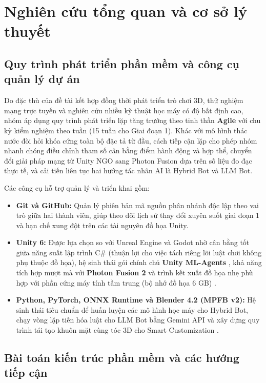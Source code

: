 \section{Nghiên cứu tổng quan và cơ sở lý thuyết}

\subsection{Quy trình phát triển phần mềm và công cụ quản lý dự án}
Do đặc thù của đề tài kết hợp đồng thời phát triển trò chơi 3D, thử nghiệm mạng trực tuyến và nghiên cứu nhiều kỹ thuật học máy có độ bất định cao, nhóm áp dụng quy trình phát triển lặp tăng trưởng theo tinh thần \textbf{Agile} với chu kỳ kiểm nghiệm theo tuần (15 tuần cho Giai đoạn 1). Khác với mô hình thác nước đòi hỏi khóa cứng toàn bộ đặc tả từ đầu, cách tiếp cận lặp cho phép nhóm nhanh chóng điều chỉnh tham số cân bằng điểm hành động và hợp thể, chuyển đổi giải pháp mạng từ Unity NGO sang Photon Fusion dựa trên số liệu đo đạc thực tế, và cải tiến liên tục hai hướng tác nhân AI là Hybrid Bot và LLM Bot.

Các công cụ hỗ trợ quản lý và triển khai gồm:
\begin{itemize}
    \item \textbf{Git và GitHub:} Quản lý phiên bản mã nguồn phân nhánh độc lập theo vai trò giữa hai thành viên, giúp theo dõi lịch sử thay đổi xuyên suốt giai đoạn 1 và hạn chế xung đột trên các tài nguyên đồ họa Unity.
    \item \textbf{Unity 6:} Được lựa chọn so với Unreal Engine và Godot nhờ cân bằng tốt giữa năng suất lập trình C\# (thuận lợi cho việc tách riêng lõi luật chơi không phụ thuộc đồ họa), hệ sinh thái gói chính chủ \textbf{Unity ML-Agents} \cite{mlagents}, khả năng tích hợp mượt mà với \textbf{Photon Fusion 2} \cite{photon_fusion} và trình kết xuất đồ họa nhẹ phù hợp với phần cứng máy tính tầm trung (bộ nhớ đồ họa 6 GB) \cite{unity6}.
    \item \textbf{Python, PyTorch, ONNX Runtime và Blender 4.2 (MPFB v2):} Hệ sinh thái tiêu chuẩn để huấn luyện các mô hình học máy cho Hybrid Bot, chạy vòng lặp tiến hóa luật cho LLM Bot bằng Gemini API và xây dựng quy trình tái tạo khuôn mặt cùng tóc 3D cho Smart Customization \cite{mpfb2}.
\end{itemize}

\subsection{Bài toán kiến trúc phần mềm và các hướng tiếp cận}
